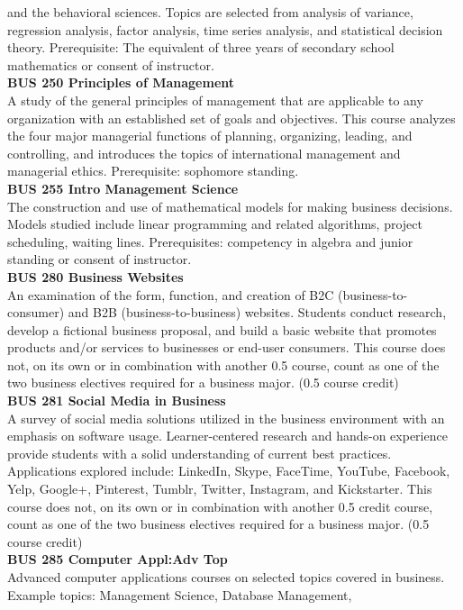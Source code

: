 \documentclass[
  letterpaper,
]{scrbook}
\begin{document}
and the behavioral sciences. Topics are selected from analysis of
variance, regression analysis, factor analysis, time series analysis,
and statistical decision theory. Prerequisite: The equivalent of three
years of secondary school mathematics or consent of instructor.\\
\textbf{BUS 250 Principles of Management}\\
A study of the general principles of management that are applicable to
any organization with an established set of goals and objectives. This
course analyzes the four major managerial functions of planning,
organizing, leading, and controlling, and introduces the topics of
international management and managerial ethics. Prerequisite: sophomore
standing.\\
\textbf{BUS 255 Intro Management Science}\\
The construction and use of mathematical models for making business
decisions. Models studied include linear programming and related
algorithms, project scheduling, waiting lines. Prerequisites: competency
in algebra and junior standing or consent of instructor.\\
\textbf{BUS 280 Business Websites}\\
An examination of the form, function, and creation of B2C
(business-to-consumer) and B2B (business-to-business) websites. Students
conduct research, develop a fictional business proposal, and build a
basic website that promotes products and/or services to businesses or
end-user consumers. This course does not, on its own or in combination
with another 0.5 course, count as one of the two business electives
required for a business major. (0.5 course credit)\\
\textbf{BUS 281 Social Media in Business}\\
A survey of social media solutions utilized in the business environment
with an emphasis on software usage. Learner-centered research and
hands-on experience provide students with a solid understanding of
current best practices. Applications explored include: LinkedIn, Skype,
FaceTime, YouTube, Facebook, Yelp, Google+, Pinterest, Tumblr, Twitter,
Instagram, and Kickstarter. This course does not, on its own or in
combination with another 0.5 credit course, count as one of the two
business electives required for a business major. (0.5 course credit)\\
\textbf{BUS 285 Computer Appl:Adv Top}\\
Advanced computer applications courses on selected topics covered in
business. Example topics: Management Science, Database Management,
\end{document}
